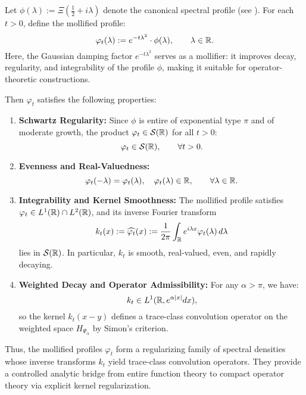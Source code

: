 \begin{definition}
\label{def:mollified_fourier_profile}
Let \( \phi(\lambda) := \Xi\left( \tfrac{1}{2} + i\lambda \right) \) denote the canonical spectral profile (see ). For each \( t > 0 \), define the mollified profile:
\[
\varphi_t(\lambda) := e^{-t\lambda^2} \cdot \phi(\lambda), \qquad \lambda \in \mathbb{R}.
\]
Here, the Gaussian damping factor \( e^{-t\lambda^2} \) serves as a mollifier: it improves decay, regularity, and integrability of the profile \( \phi \), making it suitable for operator-theoretic constructions.

Then \( \varphi_t \) satisfies the following properties:
\begin{enumerate}
  \item \textbf{Schwartz Regularity:}  
  Since \( \phi \) is entire of exponential type \( \pi \) and of moderate growth, the product \( \varphi_t \in \mathcal{S}(\mathbb{R}) \) for all \( t > 0 \):
  \[
  \varphi_t \in \mathcal{S}(\mathbb{R}), \qquad \forall t > 0.
  \]

  \item \textbf{Evenness and Real-Valuedness:}
  \[
  \varphi_t(-\lambda) = \varphi_t(\lambda), \quad \varphi_t(\lambda) \in \mathbb{R}, \qquad \forall \lambda \in \mathbb{R}.
  \]

  \item \textbf{Integrability and Kernel Smoothness:}  
  The mollified profile satisfies \( \varphi_t \in L^1(\mathbb{R}) \cap L^2(\mathbb{R}) \), and its inverse Fourier transform
  \[
  k_t(x) := \widehat{\varphi_t}(x) := \frac{1}{2\pi} \int_{\mathbb{R}} e^{i\lambda x} \varphi_t(\lambda)\, d\lambda
  \]
  lies in \( \mathcal{S}(\mathbb{R}) \). In particular, \( k_t \) is smooth, real-valued, even, and rapidly decaying.

  \item \textbf{Weighted Decay and Operator Admissibility:}  
  For any \( \alpha > \pi \), we have:
  \[
  k_t \in L^1(\mathbb{R}, e^{\alpha |x|} dx),
  \]
  so the kernel \( k_t(x - y) \) defines a trace-class convolution operator on the weighted space \( H_{\Psi_\alpha} \) by Simon’s criterion.
\end{enumerate}

\noindent
Thus, the mollified profiles \( \varphi_t \) form a regularizing family of spectral densities whose inverse transforms \( k_t \) yield trace-class convolution operators. They provide a controlled analytic bridge from entire function theory to compact operator theory via explicit kernel regularization.
\end{definition}
